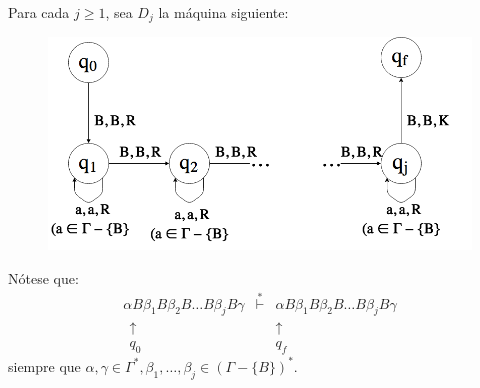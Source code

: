 \begin{frame}
  \PN Para cada $j \geq 1$, sea $D_{j}$ la máquina siguiente:
  \begin{figure}[h]
    \centering
    \includegraphics[scale=0.3]{graphics/figure_1.png}
  \end{figure}
  \PN Nótese que:
  \begin{equation*}
    \begin{array}{lcr}
      \alpha B \beta_{1} B \beta_{2} B \dotsc B \beta_{j} B \gamma &\overset{\ast}{\vdash}& \alpha B \beta_{1} B
        \beta_{2} B \dotsc B \beta_{j} B \gamma \\
      \ \ \uparrow && \uparrow \ \ \\
      \ \ q_{0} && q_{f}\ \
    \end{array}
  \end{equation*}
  \PN siempre que $\alpha, \gamma \in \Gamma^{\ast}, \beta_{1}, \dotsc, \beta_{j} \in (\Gamma - \{B\})^{\ast}$.
\end{frame}
